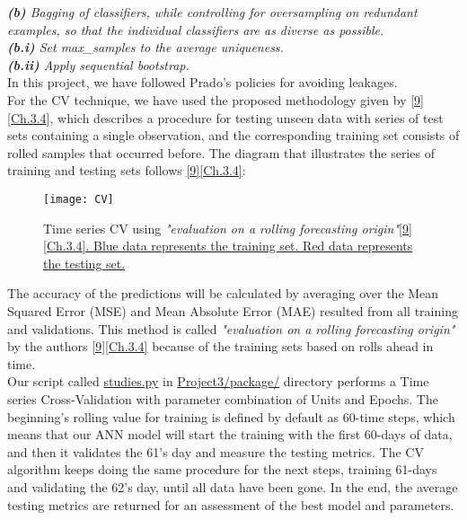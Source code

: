 \qquad \textit{\textbf{(b)} Bagging of classifiers, while controlling for oversampling on redundant examples, so that the individual classifiers are as diverse as possible.}\\

\qquad \qquad \textit{\textbf{(b.i)} Set max\_samples to the average uniqueness.}\\

\qquad \qquad \textit{\textbf{(b.ii)} Apply sequential bootstrap.}\\

In this project, we have followed Prado's policies for avoiding leakages.\\

For the CV technique, we have used the proposed methodology given by \hyperref[Bib:Hyndman, R.J., and Athanasopoulos, G.]{[9]}[\href{https://otexts.com/fpp2/}{Ch.3.4}], which describes a procedure for testing unseen data with series of test sets containing a single observation, and the corresponding training set consists of rolled samples that occurred before. The diagram that illustrates the series of training and testing sets follows \hyperref[Bib:Hyndman, R.J., and Athanasopoulos, G.]{[9][Ch.3.4]}:

\begin{figure}[H]
\label{fig:CV}
\centering
\texttt{[image: CV]}
\caption{Time series CV using \textit{"evaluation on a rolling forecasting origin"}\hyperref[Bib:Hyndman, R.J., and Athanasopoulos, G.]{[9][Ch.3.4]. Blue data represents the training set. Red data represents the testing set.}}
\end{figure}

The accuracy of the predictions will be calculated by averaging over the Mean Squared Error (MSE) and Mean Absolute Error (MAE) resulted from all training and validations. This method is called \textit{"evaluation on a rolling forecasting origin"} by the authors \hyperref[Bib:Hyndman, R.J., and Athanasopoulos, G.]{[9][Ch.3.4]} because of the training sets based on rolls ahead in time.\\

Our script called \href{https://github.com/fabiorodp/UiO-FYS-STK4155/tree/master/Project3/package/studies.py}{studies.py} in \href{https://github.com/fabiorodp/UiO-FYS-STK4155/tree/master/Project3/package/}{Project3/package/} directory performs a Time series Cross-Validation with parameter combination of Units and Epochs. The beginning's rolling value for training is defined by default as 60-time steps, which means that our ANN model will start the training with the first 60-days of data, and then it validates the 61's day and measure the testing metrics. The CV algorithm keeps doing the same procedure for the next steps, training 61-days and validating the 62's day, until all data have been gone. In the end, the average testing metrics are returned for an assessment of the best model and parameters.

